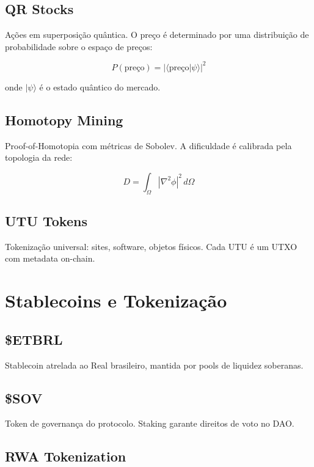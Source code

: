\documentclass[12pt,a4paper,twoside]{book}
\theoremstyle{remark}
\begin{document}
\section{QR Stocks}

Ações em superposição quântica. O preço é determinado por uma distribuição de probabilidade sobre o espaço de preços:

\begin{equation}
P(\text{preço}) = |\langle \text{preço} | \psi \rangle|^2
\end{equation}

onde $|\psi\rangle$ é o estado quântico do mercado.

\section{Homotopy Mining}

Proof-of-Homotopia com métricas de Sobolev. A dificuldade é calibrada pela topologia da rede:

\begin{equation}
D = \int_\Omega |\nabla^2 \phi|^2 \, d\Omega
\end{equation}

\section{UTU Tokens}

Tokenização universal: sites, software, objetos físicos. Cada UTU é um UTXO com metadata on-chain.

\chapter{Stablecoins e Tokenização}
\label{chap:stablecoins}

\section{\$ETBRL}

Stablecoin atrelada ao Real brasileiro, mantida por pools de liquidez soberanas.

\section{\$SOV}

Token de governança do protocolo. Staking garante direitos de voto no DAO.

\section{RWA Tokenization}
\end{document}
